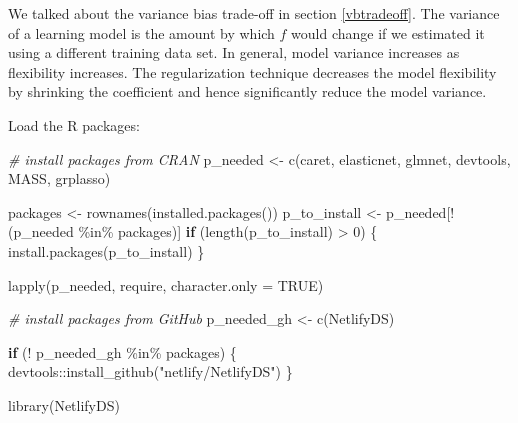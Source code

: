 \documentclass[
  12pt,
]{krantz}
\makeatletter
\newenvironment{Shaded}{\begin{snugshade}}{\end{snugshade}}
\newcommand{\AttributeTok}[1]{\textcolor[rgb]{0.61,0.61,0.61}{#1}}
\newcommand{\CommentTok}[1]{\textcolor[rgb]{0.37,0.37,0.37}{\textit{#1}}}
\newcommand{\ConstantTok}[1]{\textcolor[rgb]{0,0,0}{#1}}
\newcommand{\ControlFlowTok}[1]{\textcolor[rgb]{0.27,0.27,0.27}{\textbf{#1}}}
\newcommand{\DecValTok}[1]{\textcolor[rgb]{0.06,0.06,0.06}{#1}}
\newcommand{\FunctionTok}[1]{\textcolor[rgb]{0,0,0}{#1}}
\newcommand{\NormalTok}[1]{#1}
\newcommand{\OtherTok}[1]{\textcolor[rgb]{0.37,0.37,0.37}{#1}}
\newcommand{\SpecialCharTok}[1]{\textcolor[rgb]{0,0,0}{#1}}
\newcommand{\StringTok}[1]{\textcolor[rgb]{0.5,0.5,0.5}{#1}}
\newenvironment{kframe}{%
\medskip{}
\setlength{\fboxsep}{.8em}
 \def\at@end@of@kframe{}%
 \ifinner\ifhmode%
  \def\at@end@of@kframe{\end{minipage}}%
  \begin{minipage}{\columnwidth}%
 \fi\fi%
 \def\FrameCommand##1{\hskip\@totalleftmargin \hskip-\fboxsep
 \colorbox{shadecolor}{##1}\hskip-\fboxsep
     \hskip-\linewidth \hskip-\@totalleftmargin \hskip\columnwidth}%
 \MakeFramed {\advance\hsize-\width
   \@totalleftmargin\z@ \linewidth\hsize
   \@setminipage}}%
 {\par\unskip\endMakeFramed%
 \at@end@of@kframe}
\renewenvironment{Shaded}{\begin{kframe}}{\end{kframe}}
\makeatother
\begin{document}
We talked about the variance bias trade-off in section \ref{vbtradeoff}. The variance of a learning model is the amount by which \(\hat{f}\) would change if we estimated it using a different training data set. In general, model variance increases as flexibility increases. The regularization technique decreases the model flexibility by shrinking the coefficient and hence significantly reduce the model variance.

Load the R packages:

\begin{Shaded}
\begin{Highlighting}[]
\CommentTok{\# install packages from CRAN}
\NormalTok{p\_needed }\OtherTok{\textless{}{-}} \FunctionTok{c}\NormalTok{(}\StringTok{\textquotesingle{}caret\textquotesingle{}}\NormalTok{, }\StringTok{\textquotesingle{}elasticnet\textquotesingle{}}\NormalTok{, }\StringTok{\textquotesingle{}glmnet\textquotesingle{}}\NormalTok{, }\StringTok{\textquotesingle{}devtools\textquotesingle{}}\NormalTok{,}
              \StringTok{\textquotesingle{}MASS\textquotesingle{}}\NormalTok{, }\StringTok{\textquotesingle{}grplasso\textquotesingle{}}\NormalTok{)}

\NormalTok{packages }\OtherTok{\textless{}{-}} \FunctionTok{rownames}\NormalTok{(}\FunctionTok{installed.packages}\NormalTok{())}
\NormalTok{p\_to\_install }\OtherTok{\textless{}{-}}\NormalTok{ p\_needed[}\SpecialCharTok{!}\NormalTok{(p\_needed }\SpecialCharTok{\%in\%}\NormalTok{ packages)]}
\ControlFlowTok{if}\NormalTok{ (}\FunctionTok{length}\NormalTok{(p\_to\_install) }\SpecialCharTok{\textgreater{}} \DecValTok{0}\NormalTok{) \{}
    \FunctionTok{install.packages}\NormalTok{(p\_to\_install)}
\NormalTok{\}}

\FunctionTok{lapply}\NormalTok{(p\_needed, require, }\AttributeTok{character.only =} \ConstantTok{TRUE}\NormalTok{)}

\CommentTok{\# install packages from GitHub}
\NormalTok{p\_needed\_gh }\OtherTok{\textless{}{-}} \FunctionTok{c}\NormalTok{(}\StringTok{\textquotesingle{}NetlifyDS\textquotesingle{}}\NormalTok{)}

\ControlFlowTok{if}\NormalTok{ (}\SpecialCharTok{!}\NormalTok{ p\_needed\_gh }\SpecialCharTok{\%in\%}\NormalTok{ packages) \{}
\NormalTok{    devtools}\SpecialCharTok{::}\FunctionTok{install\_github}\NormalTok{(}\StringTok{"netlify/NetlifyDS"}\NormalTok{)}
\NormalTok{\}}

\FunctionTok{library}\NormalTok{(NetlifyDS)}
\end{Highlighting}
\end{Shaded}
\end{document}
